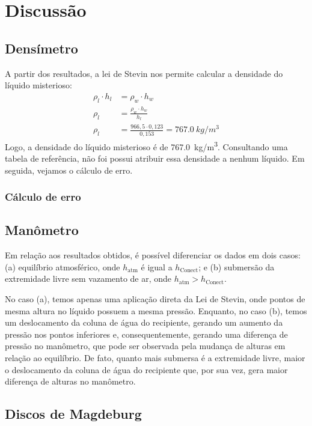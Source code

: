 \section{Discussão}
\subsection{Densímetro}

A partir dos resultados, a lei de Stevin nos permite calcular a densidade do
líquido misterioso:
\begin{align*}
    \rho_l \cdot h_l &= \rho_w \cdot h_w\\
    \rho_l &= \frac{\rho_w \cdot h_w}{h_l}\\
    \rho_l &= \frac{966,5 \cdot 0,123}{0,153} = \qty{767,0}{kg/m^3} 
\end{align*}
Logo, a densidade do líquido misterioso é de \qty{767,0}{kg/m^3}. Consultando
uma tabela de referência, não foi possui atribuir essa densidade a nenhum
líquido. Em seguida, vejamos o cálculo de erro.

\subsubsection{Cálculo de erro}


\subsection{Manômetro}

Em relação aos resultados obtidos, é possível diferenciar os dados em dois
casos: (a) equilíbrio atmosférico, onde \( h_{\text{atm}} \) é igual a \(
h_{\text{Conect}} \); e (b) submersão da extremidade livre sem vazamento de ar,
onde \( h_{\text{atm}} > h_{\text{Conect}}\). 

No caso (a), temos apenas uma aplicação direta da Lei de Stevin, onde pontos de
mesma altura no líquido possuem a mesma pressão. Enquanto, no caso (b), temos um
deslocamento da coluna de água do recipiente, gerando um aumento da pressão nos
pontos inferiores e, consequentemente, gerando uma diferença de pressão no
manômetro, que pode ser observada pela mudança de alturas em relação ao
equilíbrio. De fato, quanto mais submersa é a extremidade livre, maior o
deslocamento da coluna de água do recipiente que, por sua vez, gera maior
diferença de alturas no manômetro.

\subsection{Discos de Magdeburg}

